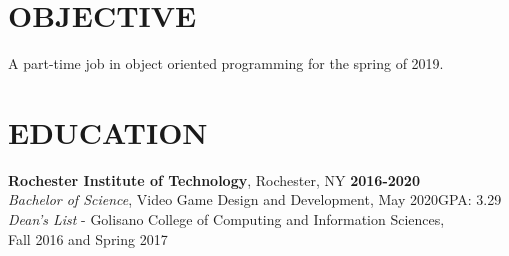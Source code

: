 \documentclass[line,margin]{res}
\begin{document}

\noindent
\makebox[0pt][l]{}%
\makebox[\textwidth][c]{}%
\makebox[0pt][l]{}%
\makebox[\textwidth][c]{}%
\makebox[0pt][l]{}%
\makebox[\textwidth][c]{}%



\begin{resume}

\section{OBJECTIVE}
A part-time job in object oriented programming for the spring of 2019.



\section{EDUCATION}
\textbf{Rochester Institute of Technology}, Rochester, NY\hfill
    \textbf{2016-2020}\\
{\sl Bachelor of Science}, Video Game Design and Development, May 2020\hfill GPA: 3.29
\\
{\sl Dean's List} - Golisano College of Computing and Information Sciences,\hfill \\ Fall 2016 and Spring 2017

\end{resume}
\end{document}
